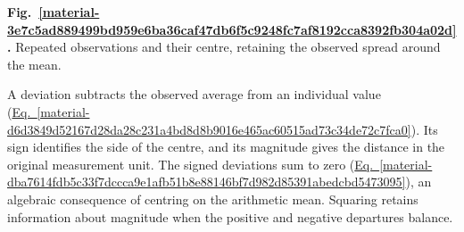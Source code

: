 \documentclass[11pt,a4paper]{article}
\begin{document}
\par\medskip
\Needspace{10cm}
\label{material-3e7c5ad889499bd959e6ba36caf47db6f5c9248fc7af8192cca8392fb304a02d}
\noindent\textbf{Fig.~\ref*{material-3e7c5ad889499bd959e6ba36caf47db6f5c9248fc7af8192cca8392fb304a02d}.} Repeated observations and their centre, retaining the observed spread around the mean.\par\nopagebreak
\begin{center}
\end{center}


\medskip

A deviation subtracts the observed average from an individual value (\hyperref[material-d6d3849d52167d28da28c231a4bd8d8b9016e465ac60515ad73c34de72c7fca0]{Eq.~\ref*{material-d6d3849d52167d28da28c231a4bd8d8b9016e465ac60515ad73c34de72c7fca0}}). Its sign identifies the side of the centre, and its magnitude gives the distance in the original measurement unit. The signed deviations sum to zero (\hyperref[material-dba7614fdb5c33f7dccca9e1afb51b8e88146bf7d982d85391abedcbd5473095]{Eq.~\ref*{material-dba7614fdb5c33f7dccca9e1afb51b8e88146bf7d982d85391abedcbd5473095}}), an algebraic consequence of centring on the arithmetic mean. Squaring retains information about magnitude when the positive and negative departures balance.
\end{document}
